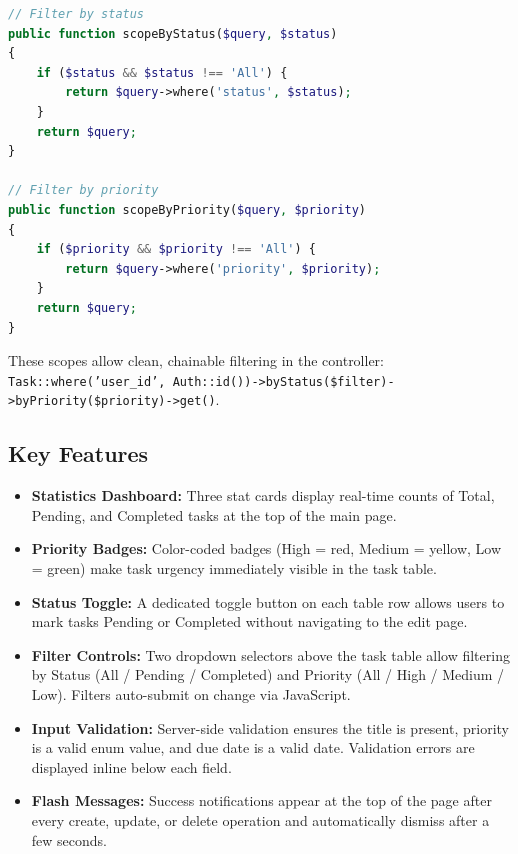 \documentclass[12pt,a4paper]{report}
\begin{document}
\begin{titlepage}
\begin{lstlisting}[language=PHP, caption={Task Model Scopes}]
// Filter by status
public function scopeByStatus($query, $status)
{
    if ($status && $status !== 'All') {
        return $query->where('status', $status);
    }
    return $query;
}

// Filter by priority
public function scopeByPriority($query, $priority)
{
    if ($priority && $priority !== 'All') {
        return $query->where('priority', $priority);
    }
    return $query;
}
\end{lstlisting}

These scopes allow clean, chainable filtering in the controller:
\texttt{Task::where('user\_id', Auth::id())->byStatus(\$filter)->byPriority(\$priority)->get()}.

\subsection{Key Features}

\begin{itemize}[leftmargin=1.5cm]
    \item \textbf{Statistics Dashboard:} Three stat cards display real-time counts of
    Total, Pending, and Completed tasks at the top of the main page.

    \item \textbf{Priority Badges:} Color-coded badges (High = red, Medium = yellow,
    Low = green) make task urgency immediately visible in the task table.

    \item \textbf{Status Toggle:} A dedicated toggle button on each table row allows
    users to mark tasks Pending or Completed without navigating to the edit page.

    \item \textbf{Filter Controls:} Two dropdown selectors above the task table allow
    filtering by Status (All / Pending / Completed) and Priority (All / High / Medium /
    Low). Filters auto-submit on change via JavaScript.

    \item \textbf{Input Validation:} Server-side validation ensures the title is present,
    priority is a valid enum value, and due date is a valid date. Validation errors are
    displayed inline below each field.

    \item \textbf{Flash Messages:} Success notifications appear at the top of the page
    after every create, update, or delete operation and automatically dismiss after a
    few seconds.


\end{itemize}
\end{titlepage}
\end{document}

